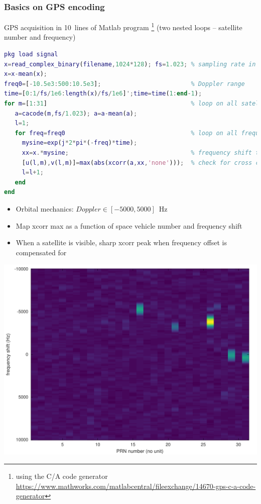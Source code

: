 \documentclass[compress,10pt]{beamer}
\begin{document}
\begin{frame}[fragile]\frametitle{Basics on GPS encoding}

GPS acquisition in 10~lines of Matlab program
\footnote{\tiny using the C/A code generator
\url{https://www.mathworks.com/matlabcentral/fileexchange/14670-gps-c-a-code-generator}} (two nested loops -- satellite number and frequency)

\begin{lstlisting}[language=Matlab]
pkg load signal
x=read_complex_binary(filename,1024*128); fs=1.023; % sampling rate in MHz
x=x-mean(x);
freq0=[-10.5e3:500:10.5e3];                         % Doppler range
time=[0:1/fs/1e6:length(x)/fs/1e6]';time=time(1:end-1);
for m=[1:31]                                        % loop on all satellites
   a=cacode(m,fs/1.023); a=a-mean(a);
   l=1;
   for freq=freq0                                   % loop on all frequency offsets
     mysine=exp(j*2*pi*(-freq)*time); 
     xx=x.*mysine;                                  % frequency shift the signal
     [u(l,m),v(l,m)]=max(abs(xcorr(a,xx,'none')));  % check for cross correlation max.
     l=l+1;
   end
end
\end{lstlisting}

\vspace{-0.70cm}
\begin{minipage}[t]{\linewidth}
\begin{minipage}{.49\linewidth}
{\footnotesize 
\begin{itemize}
\item Orbital mechanics: $Doppler\in [-5000 , 5000]$~Hz
\item Map xcorr max as a function of space vehicle number and frequency shift
\item When a satellite is visible, sharp xcorr peak when frequency offset is compensated for
\end{itemize}
}
\end{minipage}
\begin{minipage}{.49\linewidth}
\includegraphics[width=\linewidth]{../190524gps_xcorr/gps_bin100Hz}
\end{minipage}
\end{minipage}
\end{frame}
\end{document}
